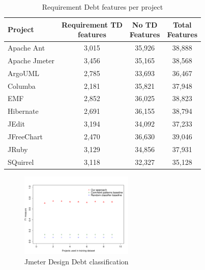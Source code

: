 \begin{table}[!hbt]
    \begin{center}
        \caption{Requirement Debt features per project}
        \label{tbl:requirement_features_per_project}
        \begin{tabular}{l| c c c }
        \toprule
        \textbf{Project} & \thead{Requirement TD\\features} & \thead{No TD\\Features} & \thead{Total\\Features} \\
        \midrule
        Apache Ant    & 3,015  & 35,926 & 38,888  \\
        Apache Jmeter & 3,456  & 35,165 & 38,568  \\
        ArgoUML       & 2,785  & 33,693 & 36,467  \\
        Columba       & 2,181  & 35,821 & 37,948  \\
        EMF           & 2,852  & 36,025 & 38,823  \\
        Hibernate     & 2,691  & 36,155 & 38,794  \\
        JEdit         & 3,194  & 34,092 & 37,233  \\
        JFreeChart    & 2,470  & 36,630 & 39,046  \\
        JRuby         & 3,129  & 34,856 & 37,931  \\
        SQuirrel      & 3,118  & 32,327 & 35,128  \\
        \bottomrule
        \end{tabular}
    \end{center}    
\end{table}

\clearpage

\begin{figure}[thb!]
  \centering
  \includegraphics[width=0.48\textwidth]{figures/appendix/iteration_details/design_jmeter.pdf}
  \vspace{-3mm}
  \caption{Jmeter Design Debt classification}
  \label{fig:design_jmeter}
\end{figure}

